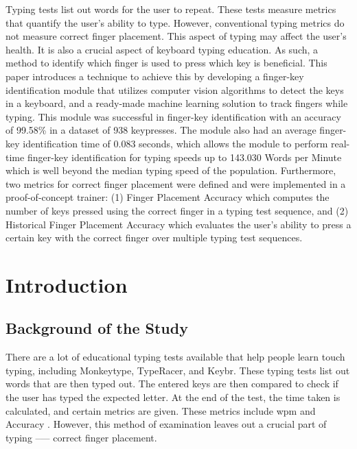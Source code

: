 \documentclass{report}
\begin{document}
Typing tests list out words for the user to repeat. These tests measure metrics
that quantify the user's ability to type. However, conventional typing metrics
do not measure correct finger placement. This aspect of typing may affect the
user's health. It is also a crucial aspect of keyboard typing education. As
such, a method to identify which finger is used to press which key is
beneficial. This paper introduces a technique to achieve this by developing a
finger-key identification module that utilizes computer vision algorithms to
detect the keys in a keyboard, and a ready-made machine learning solution to
track fingers while typing. This module was successful in finger-key
identification with an accuracy of 99.58\% in a dataset of 938 keypresses. The
module also had an average finger-key identification time of 0.083 seconds,
which allows the module to perform real-time finger-key identification for
typing speeds up to 143.030 Words per Minute which is well beyond the median
typing speed of the population. Furthermore, two metrics for correct finger
placement were defined and were implemented in a proof-of-concept trainer: (1)
Finger Placement Accuracy which computes the number of keys pressed using the
correct finger in a typing test sequence, and (2) Historical Finger Placement
Accuracy which evaluates the user's ability to press a certain key with the
correct finger over multiple typing test sequences.


\newpage

\printacronyms{}
\newpage

\listoftables
\newpage

\listoffigures
\newpage

\listofequations

\newpage

\tableofcontents
\newpage


\chapter{Introduction}


\section{Background of the Study}
There are a lot of educational typing tests available that help people learn
touch typing, including Monkeytype, TypeRacer, and Keybr. These typing tests
list out words that are then typed out. The entered keys are then compared to
check if the user has typed the expected letter. At the end of the test, the
time taken is calculated, and certain metrics are given. These metrics include
\ac{wpm} and Accuracy \parencite{arif2009}. However, this method of examination
leaves out a crucial part of typing --— correct finger placement.
\end{document}
